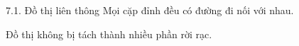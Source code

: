 \documentclass{beamer}
\begin{document}
\begin{frame}{7.1. Đồ thị liên thông}
\Large
Mọi cặp đỉnh đều có đường đi nối với nhau.

\vspace{0.3cm}
Đồ thị không bị tách thành nhiều phần rời rạc.
\end{frame}
\end{document}
